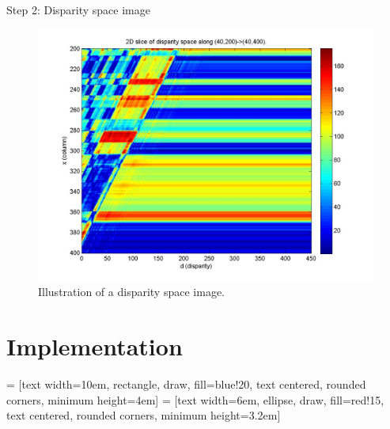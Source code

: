 \documentclass[10pt]{beamer}
\begin{document}
\begin{frame}[fragile]{Step 2: Disparity space image}
  \begin{figure}[h!]
    \centering
    \includegraphics[width=1.0\textwidth]{../paper/src/images/dsi.png}
    \caption[Disparity space image]{Illustration of a disparity space image.\protect\footnotemark}
    \label{fig:dsi}
  \end{figure}
\end{frame}

\section{Implementation}

 = [text width=10em, rectangle, draw, fill=blue!20, text centered, rounded corners, minimum height=4em]
 = [text width=6em, ellipse, draw, fill=red!15, text centered, rounded corners, minimum height=3.2em]
\end{document}
